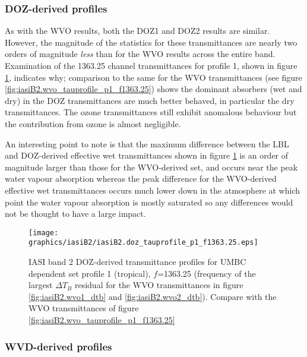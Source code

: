 \subsubsection{DOZ-derived profiles}
As with the WVO results, both the DOZ1 and DOZ2 results are similar. However, the magnitude of the statistics for these transmittances are nearly two orders of magnitude \emph{less} than for the WVO results across the entire band. Examination of the 1363.25\invcm{} channel transmittances for profile 1, shown in figure \ref{fig:iasiB2.doz_tauprofile_p1_f1363.25}, indicates why; comparison to the same for the WVO transmittances (see figure \ref{fig:iasiB2.wvo_tauprofile_p1_f1363.25}) shows the dominant absorbers (wet and dry) in the DOZ transmittances are much better behaved, in particular the dry transmittances. The ozone transmittances still exhibit anomalous behaviour but the contribution from ozone is almost negligible.

An interesting point to note is that the maximum difference between the LBL and DOZ-derived effective wet transmittances shown in figure \ref{fig:iasiB2.doz_tauprofile_p1_f1363.25} is an order of magnitude larger than those for the WVO-derived set, and occurs near the peak water vapour absorption whereas the peak difference for the WVO-derived effective wet transmittances occurs much lower down in the atmosphere at which point the water vapour absorption is mostly saturated so any differences would not be thought to have a large impact.
\begin{figure}[htp]
  \centering
  \texttt{[image: graphics/iasiB2/iasiB2.doz\_tauprofile\_p1\_f1363.25.eps]}
  \caption{IASI band 2 DOZ-derived transmittance profiles for UMBC dependent set profile 1 (tropical), $f$=1363.25\invcm{} (frequency of the largest $\Delta T_{B}$ residual for the WVO transmittances in figure \ref{fig:iasiB2.wvo1_dtb} and \ref{fig:iasiB2.wvo2_dtb}). Compare with the WVO transmittances of figure \ref{fig:iasiB2.wvo_tauprofile_p1_f1363.25}}
  \label{fig:iasiB2.doz_tauprofile_p1_f1363.25}
\end{figure}


\subsubsection{WVD-derived profiles}
